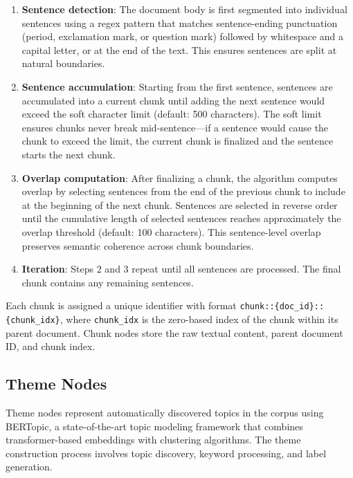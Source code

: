 \documentclass[10pt]{article}
\begin{document}
\begin{enumerate}[itemsep=2pt]
    \item \textbf{Sentence detection}: The document body is first segmented into individual sentences using a regex pattern that matches sentence-ending punctuation (period, exclamation mark, or question mark) followed by whitespace and a capital letter, or at the end of the text. This ensures sentences are split at natural boundaries.

    \item \textbf{Sentence accumulation}: Starting from the first sentence, sentences are accumulated into a current chunk until adding the next sentence would exceed the soft character limit (default: 500 characters). The soft limit ensures chunks never break mid-sentence---if a sentence would cause the chunk to exceed the limit, the current chunk is finalized and the sentence starts the next chunk.

    \item \textbf{Overlap computation}: After finalizing a chunk, the algorithm computes overlap by selecting sentences from the end of the previous chunk to include at the beginning of the next chunk. Sentences are selected in reverse order until the cumulative length of selected sentences reaches approximately the overlap threshold (default: 100 characters). This sentence-level overlap preserves semantic coherence across chunk boundaries.

    \item \textbf{Iteration}: Steps 2 and 3 repeat until all sentences are processed. The final chunk contains any remaining sentences.
\end{enumerate}

Each chunk is assigned a unique identifier with format \texttt{chunk::\{doc\_id\}::\{chunk\_idx\}}, where \texttt{chunk\_idx} is the zero-based index of the chunk within its parent document. Chunk nodes store the raw textual content, parent document ID, and chunk index.

\subsection{Theme Nodes}

Theme nodes represent automatically discovered topics in the corpus using BERTopic, a state-of-the-art topic modeling framework that combines transformer-based embeddings with clustering algorithms. The theme construction process involves topic discovery, keyword processing, and label generation.
\end{document}

